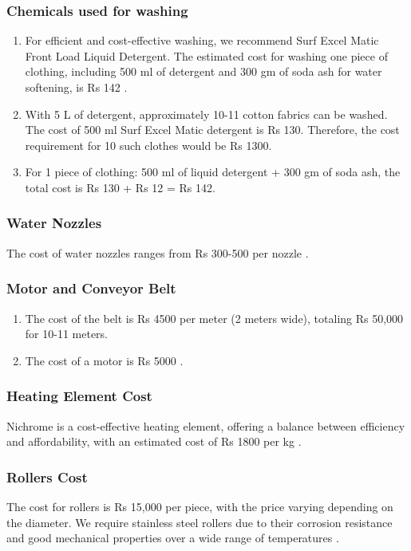 \documentclass[12pt]{article} %
\begin{document}
   \subsubsection{Chemicals used for washing} 
   \begin{enumerate}
   \item For efficient and cost-effective washing, we recommend Surf Excel Matic Front Load Liquid Detergent. The estimated cost for washing one piece of clothing, including 500 ml of detergent and 300 gm of soda ash for water softening, is Rs 142 \cite{leverette_2023_detergent}.
   \item With 5 L of detergent, approximately 10-11 cotton fabrics can be washed. The cost of 500 ml Surf Excel Matic detergent is Rs 130. Therefore, the cost requirement for 10 such clothes would be Rs 1300.
   \item For 1 piece of clothing: 500 ml of liquid detergent + 300 gm of soda ash, the total cost is Rs 130 + Rs 12 = Rs 142.
   \end{enumerate}

\subsubsection{Water Nozzles} 
The cost of water nozzles ranges from Rs 300-500 per nozzle \cite{lechler_2024_nozzles_washing}.

\subsubsection{Motor and Conveyor Belt} 
   \begin{enumerate}
   \item The cost of the belt is Rs 4500 per meter (2 meters wide), totaling Rs 50,000 for 10-11 meters.
   \item The cost of a motor is Rs 5000 \cite{exportersindia_2024_induction_motor}.
   \end{enumerate}

\subsubsection{Heating Element Cost} 
Nichrome is a cost-effective heating element, offering a balance between efficiency and affordability, with an estimated cost of Rs 1800 per kg \cite{wise_answer_2024, indiamart_2024_nichrome}.

\subsubsection{Rollers Cost} 
The cost for rollers is Rs 15,000 per piece, with the price varying depending on the diameter. We require stainless steel rollers due to their corrosion resistance and good mechanical properties over a wide range of temperatures \cite{indiamart_2024_stainless_steel_rolls}.
\end{document}
